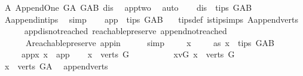 \begin{isabellebody}
\ A{}{\isacharcolon}{\kern0pt}\ Append{\isacharunderscore}{\kern0pt}One\ G{\isacharunderscore}{\kern0pt}A\ G{\isacharunderscore}{\kern0pt}AB\ dis\ \isamarkupfalse%
\ app{\isacharunderscore}{\kern0pt}two\ \isamarkupfalse%
\ auto\isanewline
\ \ \isamarkupfalse%
\ {\isachardoublequoteopen}dis\ {\isasymin}\ tips\ G{\isacharunderscore}{\kern0pt}AB\ {\isachardoublequoteclose}\ \isamarkupfalse%
\ A{}{\isachardot}{\kern0pt}append{\isacharunderscore}{\kern0pt}in{\isacharunderscore}{\kern0pt}tips\ \isamarkupfalse%
\ simp\isanewline
\ \ \isamarkupfalse%
\ {\isachardoublequoteopen}app\ {\isasymin}\ tips\ G{\isacharunderscore}{\kern0pt}AB\ {\isachardoublequoteclose}\ \isamarkupfalse%
\ tips{\isacharunderscore}{\kern0pt}def\ is{\isacharunderscore}{\kern0pt}tip{\isachardot}{\kern0pt}simps\ A{}{\isachardot}{\kern0pt}append{\isacharunderscore}{\kern0pt}verts\isanewline
\ \ \ \ \isamarkupfalse%
\ app{\isacharunderscore}{\kern0pt}dis{\isacharunderscore}{\kern0pt}not{\isacharunderscore}{\kern0pt}reached\ reachable{}{\isacharunderscore}{\kern0pt}preserve\ append{\isacharunderscore}{\kern0pt}not{\isacharunderscore}{\kern0pt}reached\isanewline
\ \ \ \ \ \ A{}{\isachardot}{\kern0pt}reachable{}{\isacharunderscore}{\kern0pt}preserve\ app{\isacharunderscore}{\kern0pt}in\isanewline
\ \ \ \ \isamarkupfalse%
\ simp\ \isanewline
\ \ \isamarkupfalse%
\ x\ \isanewline
\ \ \isamarkupfalse%
\ as{}{\isacharcolon}{\kern0pt}\ {\isachardoublequoteopen}x\ {\isasymin}\ tips\ G{\isacharunderscore}{\kern0pt}AB{\isachardoublequoteclose}\isanewline
\ \ \ \ \ app{\isacharunderscore}{\kern0pt}x{\isacharcolon}{\kern0pt}\ {\isachardoublequoteopen}x\ {\isasymnoteq}\ app{\isachardoublequoteclose}\isanewline
\ \ \isamarkupfalse%
\ {\isachardoublequoteopen}x\ {\isasymnotin}\ verts\ G{\isachardoublequoteclose}\isanewline
\ \ \isamarkupfalse%
\ \isanewline
\ \ \ \ \isamarkupfalse%
\ x{\isacharunderscore}{\kern0pt}vG{\isacharcolon}{\kern0pt}\ {\isachardoublequoteopen}x\ {\isasymin}\ verts\ G{\isachardoublequoteclose}\isanewline
\ \ \ \ \isamarkupfalse%
\ \isamarkupfalse%
\ {\isachardoublequoteopen}x\ {\isasymin}\ verts\ G{\isacharunderscore}{\kern0pt}A{\isachardoublequoteclose}\ \isamarkupfalse%
\ append{\isacharunderscore}{\kern0pt}verts\ \isamarkupfalse%

\end{isabellebody}
